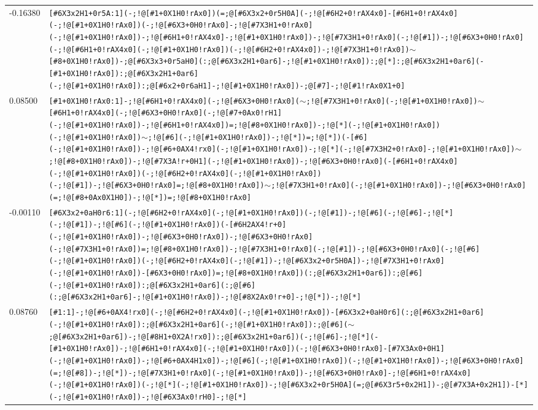 \begin{longtable}{>{\baselineskip=10pt}p{} >{\baselineskip=10pt}p{}}
-0.16380 & \texttt{[\#6X3x2H1+0r5A:1](-;!@[\#1+0X1H0!rAx0])(=;@[\#6X3x2+0r5H0A](-;!@[\#6H2+0!rAX4x0]-[\#6H1+0!rAX4x0](-;!@[\#1+0X1H0!rAx0])(-;!@[\#6X3+0H0!rAx0]-;!@[\#7X3H1+0!rAx0](-;!@[\#1+0X1H0!rAx0])-;!@[\#6H1+0!rAX4x0]-;!@[\#1+0X1H0!rAx0])-;!@[\#7X3H1+0!rAx0](-;!@[\#1])-;!@[\#6X3+0H0!rAx0](-;!@[\#6H1+0!rAX4x0](-;!@[\#1+0X1H0!rAx0])(-;!@[\#6H2+0!rAX4x0])-;!@[\#7X3H1+0!rAx0])$\sim$[\#8+0X1H0!rAx0])-;@[\#6X3x3+0r5aH0](:;@[\#6X3x2H1+0ar6]-;!@[\#1+0X1H0!rAx0]):;@[*]:;@[\#6X3x2H1+0ar6](-[\#1+0X1H0!rAx0]):;@[\#6X3x2H1+0ar6](-;!@[\#1+0X1H0!rAx0]):;@[\#6x2+0r6aH1]-;!@[\#1+0X1H0!rAx0])-;@[\#7]-;!@[\#1!rAx0X1+0]} \\ 
0.08500 & \texttt{[\#1+0X1H0!rAx0:1]-;!@[\#6H1+0!rAX4x0](-;!@[\#6X3+0H0!rAx0]($\sim$;!@[\#7X3H1+0!rAx0](-;!@[\#1+0X1H0!rAx0])$\sim$[\#6H1+0!rAX4x0](-;!@[\#6X3+0H0!rAx0](-;!@[\#7+0Ax0!rH1](-;!@[\#1+0X1H0!rAx0])-;!@[\#6H1+0!rAX4x0])=;!@[\#8+0X1H0!rAx0])-;!@[*](-;!@[\#1+0X1H0!rAx0])(-;!@[\#1+0X1H0!rAx0])$\sim$;!@[\#6](-;!@[\#1+0X1H0!rAx0])-;!@[*])=;!@[*])(-[\#6](-;!@[\#1+0X1H0!rAx0])-;!@[\#6+0AX4!rx0](-;!@[\#1+0X1H0!rAx0])-;!@[*](-;!@[\#7X3H2+0!rAx0]-;!@[\#1+0X1H0!rAx0])$\sim$;!@[\#8+0X1H0!rAx0])-;!@[\#7X3A!r+0H1](-;!@[\#1+0X1H0!rAx0])-;!@[\#6X3+0H0!rAx0](-[\#6H1+0!rAX4x0](-;!@[\#1+0X1H0!rAx0])(-;!@[\#6H2+0!rAX4x0](-;!@[\#1+0X1H0!rAx0])(-;!@[\#1])-;!@[\#6X3+0H0!rAx0]=;!@[\#8+0X1H0!rAx0])$\sim$;!@[\#7X3H1+0!rAx0](-;!@[\#1+0X1H0!rAx0])-;!@[\#6X3+0H0!rAx0](=;!@[\#8+0Ax0X1H0])-;!@[*])=;!@[\#8+0X1H0!rAx0]} \\ 
-0.00110 & \texttt{[\#6X3x2+0aH0r6:1](-;!@[\#6H2+0!rAX4x0](-;!@[\#1+0X1H0!rAx0])(-;!@[\#1])-;!@[\#6](-;!@[\#6]-;!@[*](-;!@[\#1])-;!@[\#6](-;!@[\#1+0X1H0!rAx0])(-[\#6H2AX4!r+0](-;!@[\#1+0X1H0!rAx0])-;!@[\#6X3+0H0!rAx0])-;!@[\#6X3+0H0!rAx0](-;!@[\#7X3H1+0!rAx0])=;!@[\#8+0X1H0!rAx0])-;!@[\#7X3H1+0!rAx0](-;!@[\#1])-;!@[\#6X3+0H0!rAx0](-;!@[\#6](-;!@[\#1+0X1H0!rAx0])(-;!@[\#6H2+0!rAX4x0](-;!@[\#1])-;!@[\#6X3x2+0r5H0A])-;!@[\#7X3H1+0!rAx0](-;!@[\#1+0X1H0!rAx0])-[\#6X3+0H0!rAx0])=;!@[\#8+0X1H0!rAx0])(:;@[\#6X3x2H1+0ar6]):;@[\#6](-;!@[\#1+0X1H0!rAx0]):;@[\#6X3x2H1+0ar6](:;@[\#6](:;@[\#6X3x2H1+0ar6]-;!@[\#1+0X1H0!rAx0])-;!@[\#8X2Ax0!r+0]-;!@[*])-;!@[*]} \\ 
0.08760 & \texttt{[\#1:1]-;!@[\#6+0AX4!rx0](-;!@[\#6H2+0!rAX4x0](-;!@[\#1+0X1H0!rAx0])-[\#6X3x2+0aH0r6](:;@[\#6X3x2H1+0ar6](-;!@[\#1+0X1H0!rAx0]):;@[\#6X3x2H1+0ar6](-;!@[\#1+0X1H0!rAx0]):;@[\#6]($\sim$;@[\#6X3x2H1+0ar6])-;!@[\#8H1+0X2A!rx0]):;@[\#6X3x2H1+0ar6])(-;!@[\#6]-;!@[*](-[\#1+0X1H0!rAx0])-;!@[\#6H1+0!rAX4x0](-;!@[\#1+0X1H0!rAx0])(-;!@[\#6X3+0H0!rAx0]-[\#7X3Ax0+0H1](-;!@[\#1+0X1H0!rAx0])-;!@[\#6+0AX4H1x0])-;!@[\#6](-;!@[\#1+0X1H0!rAx0])(-;!@[\#1+0X1H0!rAx0])-;!@[\#6X3+0H0!rAx0](=;!@[\#8])-;!@[*])-;!@[\#7X3H1+0!rAx0](-;!@[\#1+0X1H0!rAx0])-;!@[\#6X3+0H0!rAx0]-;!@[\#6H1+0!rAX4x0](-;!@[\#1+0X1H0!rAx0])(-;!@[*](-;!@[\#1+0X1H0!rAx0])-;!@[\#6X3x2+0r5H0A](=;@[\#6X3r5+0x2H1])-;@[\#7X3A+0x2H1])-[*](-;!@[\#1+0X1H0!rAx0])-;!@[\#6X3Ax0!rH0]-;!@[*]} \\ 

\end{longtable}
